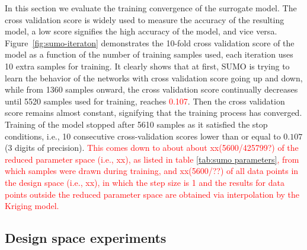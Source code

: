 In this section we evaluate the training convergence of
the surrogate model. The cross validation score is widely used to measure the accuracy of the resulting model, a low score signifies the high accuracy of the model, and vice versa. Figure~\ref{fig:sumo-iteraton} demonstrates the 10-fold cross validation score of the model as a function of the number of training samples used, each iteration uses 10 extra samples for training.  %
It clearly shows that at first, SUMO is trying to learn the behavior of the networks with cross validation score going up and down, while from 1360 samples onward, the cross validation score continually decreases until 5520 samples used for training, reaches \textcolor{red}{0.107}. Then the cross validation score remains almost constant, signifying that the training process has converged.  Training of the model stopped after 5610 samples as it satisfied the stop conditions, i.e., 10 consecutive cross-validation scores lower than or equal to $0.107$ (3 digits of precision). \textcolor{red}{This comes down to about 
about xx(5600/425799?) of the reduced parameter space (i.e., xx), as listed in table \ref{tab:sumo parameters}, from which samples were drawn during training, and xx(5600/??) of all data points in the design space (i.e., xx), in which the step size is \textcolor{red}{1} and the results for data points outside the reduced parameter space are obtained via interpolation by the Kriging  model.}





\subsection{Design space experiments}


